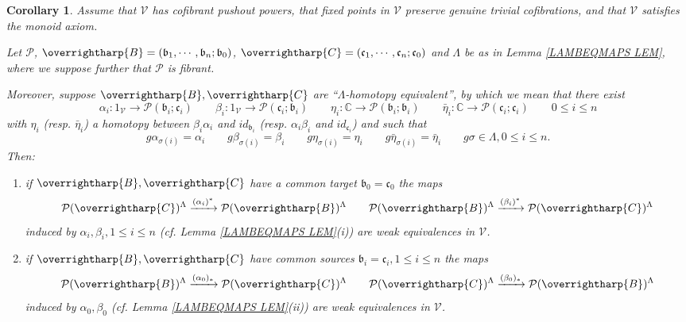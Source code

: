 \documentclass[a4paper,10pt
,draft
]{article}%
\numberwithin{equation}{section}
\numberwithin{figure}{section}
\newtheorem{corollary}[equation]{Corollary}%
\theoremstyle{definition} %
\newcommand{\vect}[1]{\text{\overrightharp{\ensuremath{#1}}}}
\newcommand{\V}{\ensuremath{\mathcal V}}
\renewcommand{\P}{\ensuremath{\mathcal P}}
\newcommand{\1}{\ensuremath{\mathbbm 1}}%
\begin{document}
\begin{corollary}\label{ALBEETA COR}
Assume that
{\color{red} $\V$ has cofibrant pushout powers, that fixed points in $\V$ preserve genuine trivial cofibrations, and that $\V$ satisfies the monoid axiom}.

Let $\P$, 
$\vect{B}=(\mathfrak{b}_1,\cdots,\mathfrak{b}_n;\mathfrak{b}_0)$,
$\vect{C}=(\mathfrak{c}_1,\cdots,\mathfrak{c}_n;\mathfrak{c}_0)$ 
and $\Lambda$ be as in 
Lemma \ref{LAMBEQMAPS LEM}, where we suppose further that
$\P$ is fibrant.

Moreover, suppose 
$\vect{B},\vect{C}$
are ``$\Lambda$-homotopy equivalent'', by which we mean that there exist 
\[
\alpha_i \colon 1_{\V} \to \P(\mathfrak{b}_i;\mathfrak{c}_i)
\qquad 
\beta_i \colon 1_{\V} \to \P(\mathfrak{c}_i;\mathfrak{b}_i)
\qquad
\eta_i \colon \mathbb{C} \to \P(\mathfrak{b}_i;\mathfrak{b}_i)
\qquad
\bar{\eta}_i \colon \mathbb{C} \to \P(\mathfrak{c}_i;\mathfrak{c}_i)
\qquad
0\leq i \leq n
\] 
with $\eta_i$ (resp. $\bar{\eta}_i$) a homotopy between 
$\beta_i\alpha_i$ and $id_{\mathfrak{b}_i}$
(resp. 
$\alpha_i\beta_i$ and $id_{\mathfrak{c}_i}$)
and such that
\[
g \alpha_{\sigma(i)} = \alpha_i \qquad
g \beta_{\sigma(i)} = \beta_i \qquad
g \eta_{\sigma(i)} = \eta_i \qquad
g \bar{\eta}_{\sigma(i)} = \bar{\eta}_i \qquad
g\sigma \in \Lambda,0\leq i \leq n.
\]
Then:
\begin{enumerate}[label=(\roman*)]
\item if $\vect{B},\vect{C}$ have a common target $\mathfrak{b}_0=\mathfrak{c}_0$ the maps
\[
\P(\vect{C})^{\Lambda} \xrightarrow{(\alpha_i)^{\**}} \P(\vect{B})^{\Lambda}
\qquad
\P(\vect{B})^{\Lambda} \xrightarrow{(\beta_i)^{\**}}
\P(\vect{C})^{\Lambda}
\]
induced by $\alpha_i,\beta_i,1\leq i \leq n$ 
(cf. Lemma \ref{LAMBEQMAPS LEM}(i)) are weak equivalences in $\V$.
\item if $\vect{B},\vect{C}$ have common sources $\mathfrak{b}_i=\mathfrak{c}_i, 1 \leq i \leq n$ the maps
\[
\P(\vect{B})^{\Lambda} \xrightarrow{(\alpha_0)_{\**}}
\P(\vect{C})^{\Lambda}
\qquad
\P(\vect{C})^{\Lambda} \xrightarrow{(\beta_0)_{\**}}
\P(\vect{B})^{\Lambda}
\]
induced by $\alpha_0,\beta_0$
(cf. Lemma \ref{LAMBEQMAPS LEM}(ii))
are weak equivalences in $\V$.
\end{enumerate}
\end{corollary}
\end{document}
